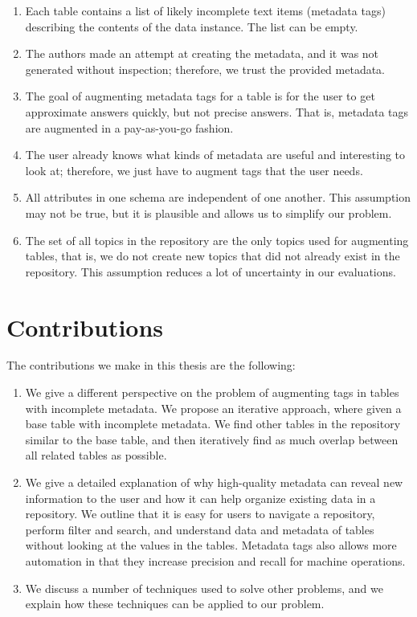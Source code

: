 \begin{enumerate}
\item Each table contains a list of likely incomplete text items (metadata tags) describing the contents of the data instance. The list can be empty.
\item The authors made an attempt at creating the metadata, and it was not generated without inspection; therefore, we trust the provided metadata.
\item The goal of augmenting metadata tags for a table is for the user to get approximate answers quickly, but not precise answers. That is, metadata tags are augmented in a pay-as-you-go fashion.
\item The user already knows what kinds of metadata are useful and interesting to look at; therefore, we just have to augment tags that the user needs.
\item All attributes in one schema are independent of one another. This assumption may not be true, but it is plausible and allows us to simplify our problem.
\item The set of all topics in the repository are the only topics used for augmenting tables, that is, we do not create new topics that did not already exist in the repository. This assumption reduces a lot of uncertainty in our evaluations.
\end{enumerate}

\section{Contributions}
\label{sec:Contributions}

The contributions we make in this thesis are the following:
\begin{enumerate}
\item We give a different perspective on the problem of augmenting tags in tables with incomplete metadata. We propose an iterative approach, where given a base table with incomplete metadata. We find other tables in the repository similar to the base table, and then iteratively find as much overlap between all related tables as possible.
\item We give a detailed explanation of why high-quality metadata can reveal new information to the user and how it can help organize existing data in a repository. We outline that it is easy for users to navigate a repository, perform filter and search, and understand data and metadata of tables without looking at the values in the tables. Metadata tags also allows more automation in that they increase precision and recall for machine operations.
\item We discuss a number of techniques used to solve other problems, and we explain how these techniques can be applied to our problem.	
\end{enumerate}

